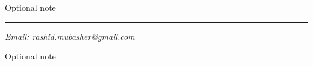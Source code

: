 \setcounter{page}{0}
\thispagestyle{fancy-blank}
\begingroup
{\large Optional note\par}
\vspace*{35mm}
{\huge\bfseries\utitle\par}

\vspace*{5mm}
{\Large\usubtitle\par}

\vspace*{4mm}
{\rule{\linewidth}{0.5mm}\par}
\vspace*{4mm}

{\large\bfseries\uauthor\par}\vspace*{1mm}

{\large\itshape\uaffiliation\newline}
{\large\itshape\udate\newline}
{\large\itshape{Email: rashid.mubasher@gmail.com}\par}

\vfill
{\large Optional note\par}
\endgroup
\clearpage

